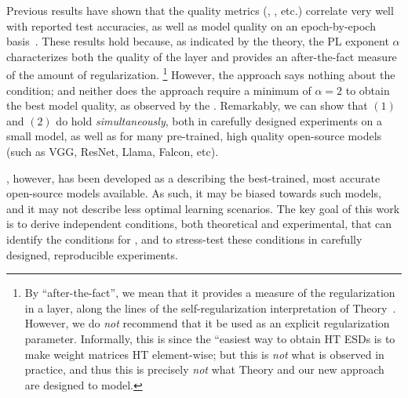Previous results have shown that the \HTSR quality metrics (\ALPHA,  \ALPHAHAT, etc.)  correlate very well with reported test accuracies,
as well as model quality on an epoch-by-epoch basis~\cite{MM18_TR_JMLRversion,KFWB13}.
These results hold because, as indicated by the \HTSR theory, the PL exponent $\alpha$ characterizes both the quality of the layer and provides an after-the-fact measure of the amount of regularization.%
\footnote{By ``after-the-fact'', we mean that it provides a measure of the regularization in a layer, along the lines of the self-regularization interpretation of \HTSR Theory~\cite{MM18_TR_JMLRversion}. However, we do \emph{not} recommend that it be used as an explicit regularization parameter. Informally, this is since the ``easiest way to obtain HT ESDs is to make weight matrices HT element-wise; but this is \emph{not} what is observed in practice, and thus this is precisely \emph{not} what \HTSR Theory and our new \SETOL approach are designed to model.}
However, the \HTSR approach says nothing about the \SETOL \TRACELOG condition; and neither does the \SETOL approach require a minimum of $\alpha=2$ to obtain the best model quality, as observed by the \HTSR \Phenomenology.
Remarkably, we can show that $(1)$ and $(2)$ do hold \emph{simultaneously}, both in carefully designed experiments on a small model,
as well as for many pre-trained, high quality open-source models (such as VGG, ResNet, Llama, Falcon, etc). 

\HTSR, however, has been developed as a \Phenomenology describing the best-trained, most accurate open-source models available.
As such, it may be biased towards such models, and it may not describe less optimal learning scenarios.
The key goal of this work is to derive independent conditions, both theoretical and experimental, that can
identify the conditions for \IdealLearning, and to stress-test these conditions in carefully designed,
reproducible experiments.

